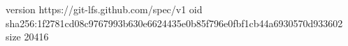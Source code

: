version https://git-lfs.github.com/spec/v1
oid sha256:1f2781cd08c9767993b630e6624435e0b85f796e0fbf1cb44a6930570d933602
size 20416
